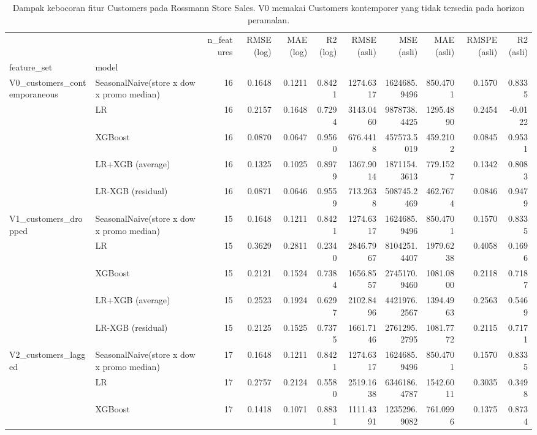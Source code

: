 \begin{table}
\caption{Dampak kebocoran fitur Customers pada Rossmann Store Sales. V0 memakai Customers kontemporer yang tidak tersedia pada horizon peramalan.}
\label{tab:tab3_rossmann_leakage_ablation}
\begin{tabular}{llrrrrrrrrr}
\toprule
 &  & n\_features & RMSE (log) & MAE (log) & R2 (log) & RMSE (asli) & MSE (asli) & MAE (asli) & RMSPE (asli) & R2 (asli) \\
feature_set & model &  &  &  &  &  &  &  &  &  \\
\midrule
\multirow[t]{5}{*}{V0\_customers\_contemporaneous} & SeasonalNaive(store x dow x promo median) & 16 & 0.1648 & 0.1211 & 0.8421 & 1274.6317 & 1624685.9496 & 850.4701 & 0.1570 & 0.8335 \\
 & LR & 16 & 0.2157 & 0.1648 & 0.7294 & 3143.0460 & 9878738.4425 & 1295.4890 & 0.2454 & -0.0122 \\
 & XGBoost & 16 & 0.0870 & 0.0647 & 0.9560 & 676.4418 & 457573.5019 & 459.2102 & 0.0845 & 0.9531 \\
 & LR+XGB (average) & 16 & 0.1325 & 0.1025 & 0.8979 & 1367.9014 & 1871154.3613 & 779.1527 & 0.1342 & 0.8083 \\
 & LR-XGB (residual) & 16 & 0.0871 & 0.0646 & 0.9559 & 713.2638 & 508745.2469 & 462.7674 & 0.0846 & 0.9479 \\
\cline{1-11}
\multirow[t]{5}{*}{V1\_customers\_dropped} & SeasonalNaive(store x dow x promo median) & 15 & 0.1648 & 0.1211 & 0.8421 & 1274.6317 & 1624685.9496 & 850.4701 & 0.1570 & 0.8335 \\
 & LR & 15 & 0.3629 & 0.2811 & 0.2340 & 2846.7967 & 8104251.4407 & 1979.6238 & 0.4058 & 0.1696 \\
 & XGBoost & 15 & 0.2121 & 0.1524 & 0.7384 & 1656.8557 & 2745170.9460 & 1081.0800 & 0.2118 & 0.7187 \\
 & LR+XGB (average) & 15 & 0.2523 & 0.1924 & 0.6297 & 2102.8496 & 4421976.2567 & 1394.4963 & 0.2563 & 0.5469 \\
 & LR-XGB (residual) & 15 & 0.2125 & 0.1525 & 0.7375 & 1661.7146 & 2761295.2795 & 1081.7772 & 0.2115 & 0.7171 \\
\cline{1-11}
\multirow[t]{5}{*}{V2\_customers\_lagged} & SeasonalNaive(store x dow x promo median) & 17 & 0.1648 & 0.1211 & 0.8421 & 1274.6317 & 1624685.9496 & 850.4701 & 0.1570 & 0.8335 \\
 & LR & 17 & 0.2757 & 0.2124 & 0.5580 & 2519.1638 & 6346186.4787 & 1542.6011 & 0.3035 & 0.3498 \\
 & XGBoost & 17 & 0.1418 & 0.1071 & 0.8831 & 1111.4391 & 1235296.9082 & 761.0996 & 0.1375 & 0.8734 \\

\end{tabular}
\end{table}
